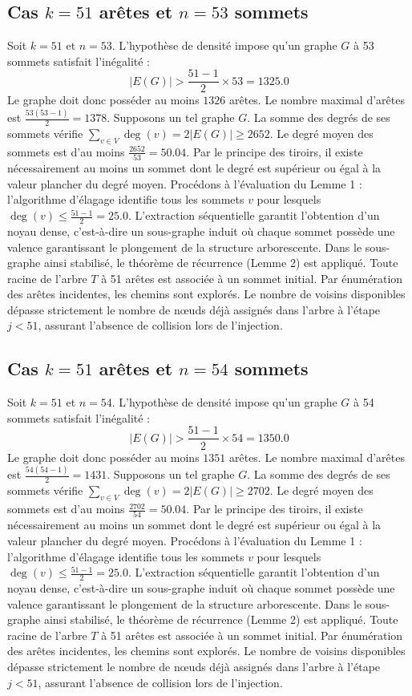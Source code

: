 \documentclass[12pt,a4paper]{article}
\begin{document}
\subsection{Cas $k = 51$ arêtes et $n = 53$ sommets}
Soit $k = 51$ et $n = 53$. L'hypothèse de densité impose qu'un graphe $G$ à 53 sommets satisfait l'inégalité :
$$ |E(G)| > \frac{51-1}{2} \times 53 = 1325.0 $$
Le graphe doit donc posséder au moins $1326$ arêtes. Le nombre maximal d'arêtes est $\frac{53(53-1)}{2} = 1378$.
Supposons un tel graphe $G$. La somme des degrés de ses sommets vérifie $\sum_{v \in V} \deg(v) = 2|E(G)| \geq 2652$.
Le degré moyen des sommets est d'au moins $\frac{2652}{53} = 50.04$.
Par le principe des tiroirs, il existe nécessairement au moins un sommet dont le degré est supérieur ou égal à la valeur plancher du degré moyen.
Procédons à l'évaluation du Lemme 1 : l'algorithme d'élagage identifie tous les sommets $v$ pour lesquels $\deg(v) \leq \frac{51-1}{2} = 25.0$.
L'extraction séquentielle garantit l'obtention d'un noyau dense, c'est-à-dire un sous-graphe induit où chaque sommet possède une valence garantissant le plongement de la structure arborescente.
Dans le sous-graphe ainsi stabilisé, le théorème de récurrence (Lemme 2) est appliqué. Toute racine de l'arbre $T$ à 51 arêtes est associée à un sommet initial. Par énumération des arêtes incidentes, les chemins sont explorés. Le nombre de voisins disponibles dépasse strictement le nombre de nœuds déjà assignés dans l'arbre à l'étape $j < 51$, assurant l'absence de collision lors de l'injection.

\subsection{Cas $k = 51$ arêtes et $n = 54$ sommets}
Soit $k = 51$ et $n = 54$. L'hypothèse de densité impose qu'un graphe $G$ à 54 sommets satisfait l'inégalité :
$$ |E(G)| > \frac{51-1}{2} \times 54 = 1350.0 $$
Le graphe doit donc posséder au moins $1351$ arêtes. Le nombre maximal d'arêtes est $\frac{54(54-1)}{2} = 1431$.
Supposons un tel graphe $G$. La somme des degrés de ses sommets vérifie $\sum_{v \in V} \deg(v) = 2|E(G)| \geq 2702$.
Le degré moyen des sommets est d'au moins $\frac{2702}{54} = 50.04$.
Par le principe des tiroirs, il existe nécessairement au moins un sommet dont le degré est supérieur ou égal à la valeur plancher du degré moyen.
Procédons à l'évaluation du Lemme 1 : l'algorithme d'élagage identifie tous les sommets $v$ pour lesquels $\deg(v) \leq \frac{51-1}{2} = 25.0$.
L'extraction séquentielle garantit l'obtention d'un noyau dense, c'est-à-dire un sous-graphe induit où chaque sommet possède une valence garantissant le plongement de la structure arborescente.
Dans le sous-graphe ainsi stabilisé, le théorème de récurrence (Lemme 2) est appliqué. Toute racine de l'arbre $T$ à 51 arêtes est associée à un sommet initial. Par énumération des arêtes incidentes, les chemins sont explorés. Le nombre de voisins disponibles dépasse strictement le nombre de nœuds déjà assignés dans l'arbre à l'étape $j < 51$, assurant l'absence de collision lors de l'injection.
\end{document}
